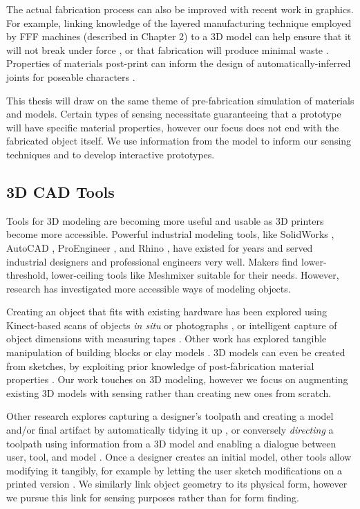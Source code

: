     The actual fabrication process can also be improved with recent work in graphics. For example, linking knowledge of the layered manufacturing technique employed by FFF machines (described in Chapter 2) to a 3D model can help ensure that it will not break under force \cite{umetani-strength}, or that fabrication will produce minimal waste \cite{schmidt-support}. Properties of materials post-print can inform the design of automatically-inferred joints for poseable characters \cite{bacher-posable,cali-articulated}.
    
    This thesis will draw on the same theme of pre-fabrication simulation of materials and models. Certain types of sensing necessitate guaranteeing that a prototype will have specific material properties, however our focus does not end with the fabricated object itself. We use information from the model to inform our sensing techniques and to develop interactive prototypes.
    
\subsection{3D CAD Tools}
    Tools for 3D modeling are becoming more useful and usable as 3D printers become more accessible. Powerful industrial modeling tools, like SolidWorks \cite{solidworks}, AutoCAD \cite{autocad}, ProEngineer \cite{proe}, and Rhino \cite{rhino}, have existed for years and served industrial designers and professional engineers very well. Makers find lower-threshold, lower-ceiling tools like Meshmixer \cite{schmidt-meshmixer} suitable for their needs. However, research has investigated more accessible ways of modeling objects.
    
    Creating an object that fits with existing hardware has been explored using Kinect-based scans of objects \emph{in situ} \cite{molyneaux-kinectfusion, weichel-mixfab} or photographs \cite{lau-modeling}, or intelligent capture of object dimensions with measuring tapes \cite{lee-handscape,weichel-spata}. Other work has explored tangible manipulation of building blocks \cite{anderson-tangible, gupta-duplotrack} or clay models \cite{savage-mmarks}. 3D models can even be created from sketches, by exploiting prior knowledge of post-fabrication material properties \cite{mori-plushie, saul-sketchchair}. Our work touches on 3D modeling, however we focus on augmenting existing 3D models with sensing rather than creating new ones from scratch.
    
    Other research explores capturing a designer's toolpath and creating a model and/or final artifact by automatically tidying it up \cite{willis-interactive, mueller-constructable, mueller-laserorigami}, or conversely \emph{directing} a toolpath using information from a 3D model and enabling a dialogue between user, tool, and model \cite{zoran-freed}. Once a designer creates an initial model, other tools allow modifying it tangibly, for example by letting the user sketch modifications on a printed version \cite{song-modelcraft-tochi}. We similarly link object geometry to its physical form, however we pursue this link for sensing purposes rather than for form finding.
    
